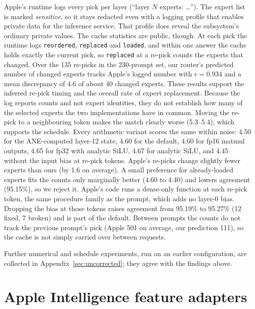 \documentclass[11pt,reqno]{amsart}
\makeatletter
\newcommand{\code}[1]{\texttt{#1}}
\renewcommand\paragraph{\@startsection{paragraph}{4}\z@{.6\linespacing\@plus.2\linespacing}{-\fontdimen2\font}{\normalfont\bfseries}}
\theoremstyle{definition}
\makeatother
\begin{document}
\paragraph{Apple's own expert decisions.} Apple's runtime logs every pick per layer (``layer $N$ experts: \dots''). The expert list is marked \emph{sensitive}, so it stays redacted even with a logging profile that enables private data for the inference service. That profile does reveal the subsystem's ordinary private values. The cache statistics are public, though. At each pick the runtime logs \code{reordered}, \code{replaced} and \code{loaded}, and within one answer the cache holds exactly the current pick, so \code{replaced} at a re-pick counts the experts that changed. Over the 135 re-picks in the 230-prompt set, our router's predicted number of changed experts tracks Apple's logged number with $r=0.934$ and a mean discrepancy of 4.6 of about 40 changed experts. These results support the inferred re-pick timing and the overall rate of expert replacement. Because the log reports counts and not expert identities, they do not establish how many of the selected experts the two implementations have in common. Moving the re-pick to a neighbouring token makes the match clearly worse (5.3--5.4), which supports the schedule. Every arithmetic variant scores the same within noise: 4.50 for the ANE-computed layer-12 state, 4.60 for the default, 4.60 for fp16 matmul outputs, 4.65 for fp32 with analytic SiLU, 4.67 for analytic SiLU, and 4.45 without the input bias at re-pick tokens. Apple's re-picks change slightly fewer experts than ours (by 1.6 on average). A small preference for already-loaded experts fits the counts only marginally better (4.60 to 4.40) and lowers agreement (95.15\%), so we reject it. Apple's code runs a dense-only function at each re-pick token, the same procedure family as the prompt, which adds no layer-0 bias. Dropping the bias at those tokens raises agreement from 95.19\% to 95.27\% (12 fixed, 7 broken) and is part of the default. Between prompts the counts do not track the previous prompt's pick (Apple 501 on average, our prediction 111), so the cache is not simply carried over between requests.

Further numerical and schedule experiments, run on an earlier configuration, are collected in Appendix~\ref{sec:uncorrected}; they agree with the findings above.

\section{Apple Intelligence feature adapters}\label{sec:adapters}
\end{document}
